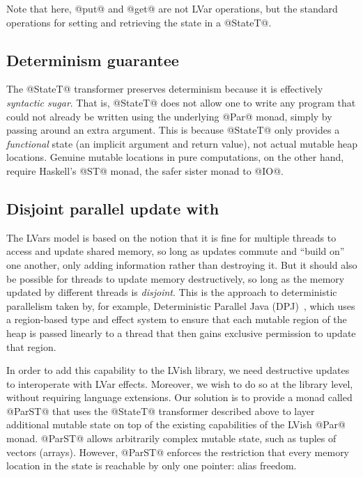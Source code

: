Note that here, @put@ and @get@ are not LVar operations, but the
standard operations for setting and retrieving the state in a
@StateT@.

\subsection{Determinism guarantee}

The @StateT@ transformer preserves determinism because it is
effectively \emph{syntactic sugar}.  That is, @StateT@ does not allow
one to write any program that could not already be written using the
underlying @Par@ monad, simply by passing around an extra argument.
This is because @StateT@ only provides a \emph{functional} state (an
implicit argument and return value), not actual mutable heap
locations.  Genuine mutable locations in pure computations, on the
other hand, require Haskell's @ST@ monad, the safer sister monad to
@IO@.

\subsection{Disjoint parallel update with }

The LVars model is based on the notion that it is fine for multiple
threads to access and update shared memory, so long as updates commute
and ``build on'' one another, only adding information rather than
destroying it.  But it should also be possible for threads to update
memory destructively, so long as the memory updated by different
threads is \emph{disjoint}.  This is the approach to deterministic
parallelism taken by, for example, Deterministic Parallel Java
(DPJ)~\cite{dpj-oopsla}, which uses a region-based type and effect
system to ensure that each mutable region of the heap is passed
linearly to a thread that then gains exclusive permission to update
that region.

In order to add this capability to the LVish library, we need
destructive updates to interoperate with LVar effects.  Moreover, we
wish to do so at the library level, without requiring language
extensions.  Our solution is to provide a monad called @ParST@ that
uses the @StateT@ transformer described above to layer additional
mutable state on top of the existing capabilities of the LVish @Par@
monad.  @ParST@ allows arbitrarily complex mutable state, such as
tuples of vectors (arrays).  However, @ParST@ enforces the restriction
that every memory location in the state is reachable by only one
pointer: alias freedom.

